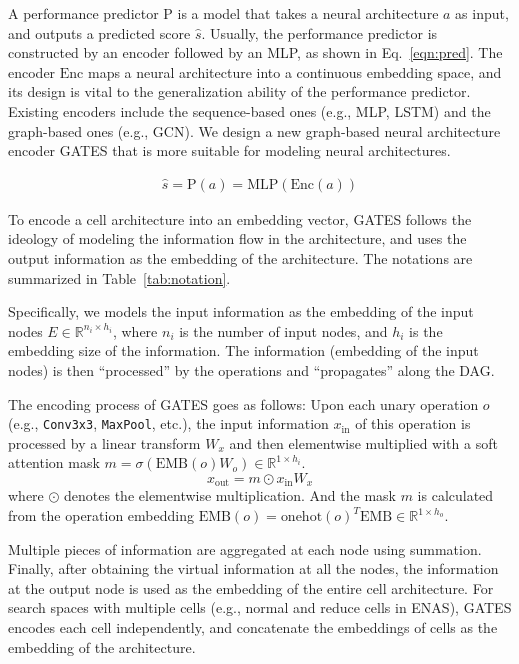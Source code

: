 \documentclass[runningheads]{llncs}
\begin{document}
A performance predictor $\mbox{P}$ is a model that takes a neural architecture $a$ as input, and outputs a predicted score $\hat{s}$. Usually, the performance predictor is constructed by an encoder followed by an MLP, as shown in Eq.~\ref{eqn:pred}. 
The encoder $\mbox{Enc}$ maps a neural architecture into a continuous embedding space, and its design is vital to the generalization ability of the performance predictor. Existing encoders include the sequence-based ones (e.g., MLP, LSTM) and the graph-based ones (e.g., GCN). We design a new graph-based neural architecture encoder GATES that is more suitable for modeling neural architectures.

\begin{equation}
    \begin{aligned}
    \hat{s} = \mbox{P}(a) = \mbox{MLP}(\mbox{Enc}(a))
    \end{aligned}
    \label{eqn:pred}
\end{equation}


To encode a cell architecture into an embedding vector, GATES follows the ideology of modeling the information flow in the architecture, and uses the output information as the embedding of the architecture. The notations are summarized in Table~\ref{tab:notation}.

Specifically, we models the input information as the embedding of the input nodes $E \in \mathbb{R}^{n_i\times h_i}$, where $n_i$ is the number of input nodes,
and $h_i$ is the embedding size of the information.
The information (embedding of the input nodes) is then ``processed'' by the operations and ``propagates'' along the DAG.

The encoding process of GATES goes as follows: Upon each unary operation $o$ (e.g., \texttt{Conv3x3}, \texttt{MaxPool}, etc.), the input information $x_{\mbox{in}}$ of this operation is processed by a linear transform $W_x$ and then elementwise multiplied with a soft attention mask $m=\sigma(\mbox{EMB}(o)W_o) \in \mathbb{R}^{1 \times h_i}$.
\begin{equation}
  x_{\mbox{out}} = m \odot x_{\mbox{in}} W_x
\end{equation}
where $\odot$ denotes the elementwise multiplication. And the mask $m$ is calculated from the operation embedding $\mbox{EMB}(o) = \mbox{onehot}(o)^T \mbox{EMB} \in \mathbb{R}^{1 \times h_o}$.

Multiple pieces of information are aggregated at each node using summation.
Finally, after obtaining the virtual information at all the nodes, the information at the output node is used as the embedding of the entire cell architecture. For search spaces with multiple cells (e.g., normal and reduce cells in ENAS), GATES encodes each cell independently, and concatenate the embeddings of cells as the embedding of the architecture.
\end{document}
